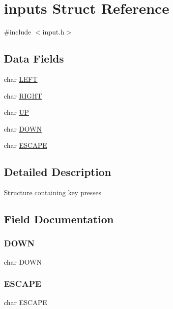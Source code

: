 \hypertarget{structinputs}{}\section{inputs Struct Reference}
\label{structinputs}


{\ttfamily \#include $<$input.\+h$>$}

\subsection*{Data Fields}
\begin{DoxyCompactItemize}
\item 
char \mbox{\hyperlink{structinputs_abf3a99e39f90b8c0b0adb499e8be44cb}{L\+E\+FT}}
\item 
char \mbox{\hyperlink{structinputs_ab56909fbd462ae4fa285e24388efcf9a}{R\+I\+G\+HT}}
\item 
char \mbox{\hyperlink{structinputs_acf487aade419fe84132d0b08da4636b8}{UP}}
\item 
char \mbox{\hyperlink{structinputs_aefd805006968caf870982fabe4a6494d}{D\+O\+WN}}
\item 
char \mbox{\hyperlink{structinputs_a15675417ba5a32ad2202c86452a52010}{E\+S\+C\+A\+PE}}
\end{DoxyCompactItemize}


\subsection{Detailed Description}
Structure containing key presses 

\subsection{Field Documentation}
\mbox{\label{structinputs_aefd805006968caf870982fabe4a6494d}} 
\subsubsection{\texorpdfstring{DOWN}{DOWN}}
{\footnotesize\ttfamily char D\+O\+WN}

\mbox{\label{structinputs_a15675417ba5a32ad2202c86452a52010}} 
\subsubsection{\texorpdfstring{ESCAPE}{ESCAPE}}
{\footnotesize\ttfamily char E\+S\+C\+A\+PE}


